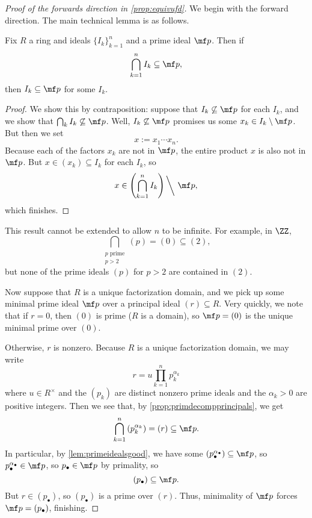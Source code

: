 \documentclass[../notes.tex]{subfiles}
\begin{document}
\begin{proof}[Proof of the forwards direction in \autoref{prop:equivufd}]
	We begin with the forward direction. The main technical lemma is as follows.
	\begin{lemma} \label{lem:primeidealsgood}
		Fix $R$ a ring and ideals $\{I_k\}_{k=1}^n$ and a prime ideal $\mf p$. Then if
		\[\bigcap_{k=1}^nI_k\subseteq\mf p,\]
		then $I_k\subseteq\mf p$ for some $I_k$.
	\end{lemma}
	\begin{proof}
		We show this by contraposition: suppose that $I_k\not\subseteq\mf p$ for each $I_k$, and we show that $\bigcap_kI_k\not\subseteq\mf p$. Well, $I_k\not\subseteq\mf p$ promises us some $x_k\in I_k\setminus\mf p$. But then we set
		\[x:=x_1\cdots x_n.\]
		Because each of the factors $x_k$ are not in $\mf p$, the entire product $x$ is also not in $\mf p$. But $x\in(x_k)\subseteq I_k$ for each $I_k$, so
		\[x\in\left(\bigcap_{k=1}^nI_k\right){\mathbin\bigg\backslash}~\mf p,\]
		which finishes.
	\end{proof}
	\begin{remark}[Nir]
		This result cannot be extended to allow $n$ to be infinite. For example, in $\ZZ$,
		\[\bigcap_{\substack{p\text{ prime}\\p>2}}(p)=(0)\subseteq(2),\]
		but none of the prime ideals $(p)$ for $p>2$ are contained in $(2)$.
	\end{remark}
	Now suppose that $R$ is a unique factorization domain, and we pick up some minimal prime ideal $\mf p$ over a principal ideal $(r)\subseteq R$. Very quickly, we note that if $r=0$, then $(0)$ is prime ($R$ is a domain), so $\mf p=(0)$ is the unique minimal prime over $(0)$.
	
	Otherwise, $r$ is nonzero. Because $R$ is a unique factorization domain, we may write
	\[r=u\prod_{k=1}^np_k^{\alpha_k}\]
	where $u\in R^\times$ and the $(p_k)$ are distinct nonzero prime ideals and the $\alpha_k>0$ are positive integers. Then we see that, by \autoref{prop:primdecompprincipals}, we get
	\[\bigcap_{k=1}^n\left(p_k^{\alpha_k}\right)=(r)\subseteq\mf p.\]
	In particular, by \autoref{lem:primeidealsgood}, we have some $\left(p_\bullet^{\alpha_\bullet}\right)\subseteq\mf p$, so $p_\bullet^{\alpha_\bullet}\in\mf p$, so $p_\bullet\in\mf p$ by primality, so
	\[(p_\bullet)\subseteq\mf p.\]
	But $r\in(p_\bullet)$, so $(p_\bullet)$ is a prime over $(r)$. Thus, minimality of $\mf p$ forces $\mf p=(p_\bullet)$, finishing.
\end{proof}
\end{document}

